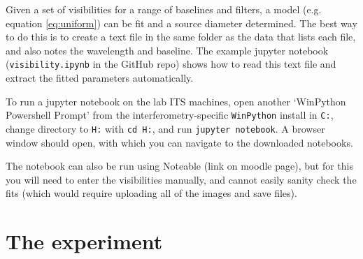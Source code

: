 \documentclass[11pt]{article}
\begin{document}
Given a set of visibilities for a range of baselines and filters, a model (e.g. equation \ref{eq:uniform}) can be fit and a source diameter determined. The best way to do this is to create a text file in the same folder as the data that lists each file, and also notes the wavelength and baseline. The example jupyter notebook (\texttt{visibility.ipynb} in the GitHub repo) shows how to read this text file and extract the fitted parameters automatically.

To run a jupyter notebook on the lab ITS machines, open another `WinPython Powershell Prompt' from the interferometry-specific \texttt{WinPython} install in \texttt{C:}, change directory to \texttt{H:} with \texttt{cd H:}, and run \texttt{jupyter notebook}. A browser window should open, with which you can navigate to the downloaded notebooks.

The notebook can also be run using Noteable (link on moodle page), but for this you will need to enter the visibilities manually, and cannot easily sanity check the fits (which would require uploading all of the images and save files).

\clearpage

\section{The experiment}\label{sec:exp}
\end{document}
